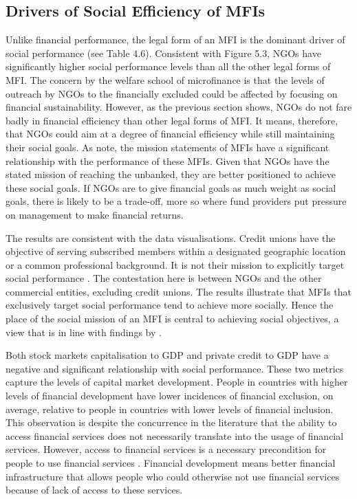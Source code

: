 \documentclass[a4paper, nobind]{templates/ociamthesis}
\begin{document}
\begin{landscape}
\end{landscape}

\newpage

\hypertarget{drivers-of-social-efficiency-of-mfis}{%
\subsection{Drivers of Social Efficiency of MFIs}\label{drivers-of-social-efficiency-of-mfis}}

Unlike financial performance, the legal form of an MFI is the dominant driver of social performance (see Table 4.6). Consistent with Figure 5.3, NGOs have significantly higher social performance levels than all the other legal forms of MFI. The concern by the welfare school of microfinance is that the levels of outreach by NGOs to the financially excluded could be affected by focusing on financial sustainability. However, as the previous section shows, NGOs do not fare badly in financial efficiency than other legal forms of MFI. It means, therefore, that NGOs could aim at a degree of financial efficiency while still maintaining their social goals. As \textcite{mersland2019social} note, the mission statements of MFIs have a significant relationship with the performance of these MFIs. Given that NGOs have the stated mission of reaching the unbanked, they are better positioned to achieve these social goals. If NGOs are to give financial goals as much weight as social goals, there is likely to be a trade-off, more so where fund providers put pressure on management to make financial returns.

The results are consistent with the data visualisations. Credit unions have the objective of serving subscribed members within a designated geographic location or a common professional background. It is not their mission to explicitly target social performance \autocite{mathuva2017achieving}. The contestation here is between NGOs and the other commercial entities, excluding credit unions. The results illustrate that MFIs that exclusively target social performance tend to achieve more socially. Hence the place of the social mission of an MFI is central to achieving social objectives, a view that is in line with findings by \textcite{berbegal2019impact}.

Both stock markets capitalisation to GDP and private credit to GDP have a negative and significant relationship with social performance. These two metrics capture the levels of capital market development. People in countries with higher levels of financial development have lower incidences of financial exclusion, on average, relative to people in countries with lower levels of financial inclusion. This observation is despite the concurrence in the literature that the ability to access financial services does not necessarily translate into the usage of financial services. However, access to financial services is a necessary precondition for people to use financial services \autocite{allen2013resolving,jarotschkin2013microfinance}. Financial development means better financial infrastructure that allows people who could otherwise not use financial services because of lack of access to these services.
\end{document}
